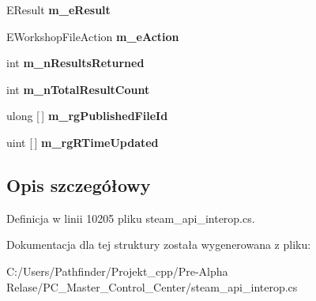 \begin{DoxyCompactItemize}
\item 
\mbox{\label{struct_valve_1_1_steamworks_1_1_remote_storage_enumerate_published_files_by_user_action_result__t_ad6cc21b16506230965d763697d60de35}} 
E\+Result {\bfseries m\+\_\+e\+Result}
\item 
\mbox{\label{struct_valve_1_1_steamworks_1_1_remote_storage_enumerate_published_files_by_user_action_result__t_a0b30788b488e07c938671bf933693040}} 
E\+Workshop\+File\+Action {\bfseries m\+\_\+e\+Action}
\item 
\mbox{\label{struct_valve_1_1_steamworks_1_1_remote_storage_enumerate_published_files_by_user_action_result__t_afcb2f43f473f1d10b80d882e5f416e32}} 
int {\bfseries m\+\_\+n\+Results\+Returned}
\item 
\mbox{\label{struct_valve_1_1_steamworks_1_1_remote_storage_enumerate_published_files_by_user_action_result__t_a227b4d65fd7901c0ea32a90c16f0ab6a}} 
int {\bfseries m\+\_\+n\+Total\+Result\+Count}
\item 
\mbox{\label{struct_valve_1_1_steamworks_1_1_remote_storage_enumerate_published_files_by_user_action_result__t_a132adbacce18ca2069b7bace72cc1109}} 
ulong \mbox{[}$\,$\mbox{]} {\bfseries m\+\_\+rg\+Published\+File\+Id}
\item 
\mbox{\label{struct_valve_1_1_steamworks_1_1_remote_storage_enumerate_published_files_by_user_action_result__t_a0123af50ca8bde585adff57092bf80b4}} 
uint \mbox{[}$\,$\mbox{]} {\bfseries m\+\_\+rg\+R\+Time\+Updated}
\end{DoxyCompactItemize}


\subsection{Opis szczegółowy}


Definicja w linii 10205 pliku steam\+\_\+api\+\_\+interop.\+cs.



Dokumentacja dla tej struktury została wygenerowana z pliku\+:\begin{DoxyCompactItemize}
\item 
C\+:/\+Users/\+Pathfinder/\+Projekt\+\_\+cpp/\+Pre-\/\+Alpha Relase/\+P\+C\+\_\+\+Master\+\_\+\+Control\+\_\+\+Center/steam\+\_\+api\+\_\+interop.\+cs\end{DoxyCompactItemize}
